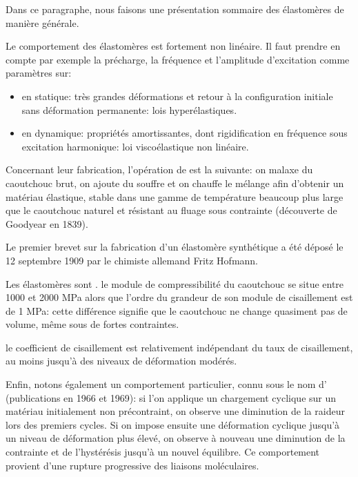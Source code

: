 Dans ce paragraphe, nous faisons une présentation sommaire des élastomères de manière
générale.

\medskip
Le comportement des élastomères est fortement non linéaire.
Il faut prendre en compte par exemple la précharge, la fréquence et l'amplitude
d'excitation comme paramètres sur:
\begin{itemize}
	\item en statique: très grandes déformations et retour à la configuration
		initiale sans déformation permanente: lois hyperélastiques.
	\item en dynamique: propriétés amortissantes, dont rigidification en fréquence
		sous excitation harmonique: loi viscoélastique non linéaire.
\end{itemize}

\medskip
Concernant leur fabrication, l'opération de  est la suivante:
on malaxe du caoutchouc brut, on ajoute du souffre et on chauffe le
mélange afin d'obtenir un matériau élastique, stable dans une gamme de température
beaucoup plus large que le caoutchouc naturel et résistant au fluage sous contrainte
(découverte de Goodyear en 1839).

Le premier brevet sur la fabrication d'un élastomère synthétique a été déposé le 12 septembre
1909 par le chimiste allemand Fritz Hofmann.

\medskip
Les élastomères sont .
le module de compressibilité du caoutchouc se situe entre 1000 et 2000 MPa alors
que l'ordre du grandeur de son module de cisaillement est de 1 MPa: cette différence
signifie que le caoutchouc ne change quasiment pas de volume, même sous de
fortes contraintes.

\medskip
{}
le coefficient de cisaillement est relativement indépendant du taux de cisaillement, au moins
jusqu'à des niveaux de déformation modérés.

\medskip
Enfin, notons également un comportement particulier, connu sous le nom d' (publications en 1966 et 1969):
si l'on applique un chargement cyclique sur un matériau initialement non précontraint,
on observe une diminution de la raideur lors des premiers cycles. Si on impose ensuite une
déformation cyclique jusqu'à un niveau de déformation plus élevé, on observe
à nouveau une diminution de la contrainte et de l'hystérésis jusqu'à un
nouvel équilibre. Ce comportement provient d'une rupture progressive des
liaisons moléculaires.


